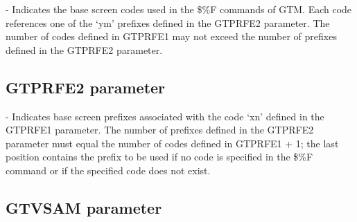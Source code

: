 \documentclass[letterpaper,10pt,english]{sphinxmanual}
\begin{document}
 - Indicates the base screen codes used in the \$\%F commands of GTM. Each code references one of the ‘ym’ prefixes defined in the GTPRFE2 parameter. The number of codes defined in GTPRFE1 may not exceed the number of prefixes defined in the GTPRFE2 parameter.

\ignorespaces 

\subsection{GTPRFE2 parameter}
\label{\detokenize{Installation_Guide:gtprfe2-parameter}}\label{\detokenize{Installation_Guide:index-72}}
\begin{sphinxVerbatim}[commandchars=\\\{\}]
     
\end{sphinxVerbatim}

 - Indicates base screen prefixes associated with the code ‘xn’ defined in the GTPRFE1 parameter. The number of prefixes defined in the GTPRFE2 parameter must equal the number of codes defined in GTPRFE1 + 1; the last position contains the prefix to be used if no code is specified in the \$\%F command or if the specified code does not exist.

\ignorespaces 

\subsection{GTVSAM parameter}
\label{\detokenize{Installation_Guide:gtvsam-parameter}}\label{\detokenize{Installation_Guide:index-73}}
\begin{sphinxVerbatim}[commandchars=\\\{\}]
       
\end{sphinxVerbatim}
\end{document}
